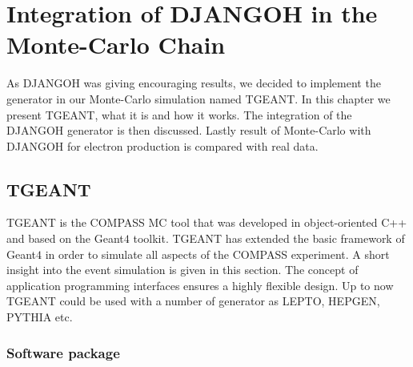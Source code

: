 
\chapter{Integration of DJANGOH in the Monte-Carlo Chain} %

\label{ch:MC} %


As DJANGOH was giving encouraging results, we decided to implement the generator in our Monte-Carlo simulation named TGEANT. In this chapter we present TGEANT, what it is and how it works. The integration of the DJANGOH generator is then discussed. Lastly result of Monte-Carlo with DJANGOH for electron production is compared with real data.

\section{TGEANT}

TGEANT \cite{Tobias} is the COMPASS MC tool that was developed in object-oriented C++ and based on the Geant$4$ toolkit. TGEANT has extended the basic framework of Geant$4$ in order to simulate all aspects of the COMPASS experiment. A short insight into the event simulation is given in this section.
The concept of application programming interfaces ensures a highly flexible design. Up to now TGEANT could be used with a number of generator as LEPTO, HEPGEN, PYTHIA etc.

\subsection{Software package}

